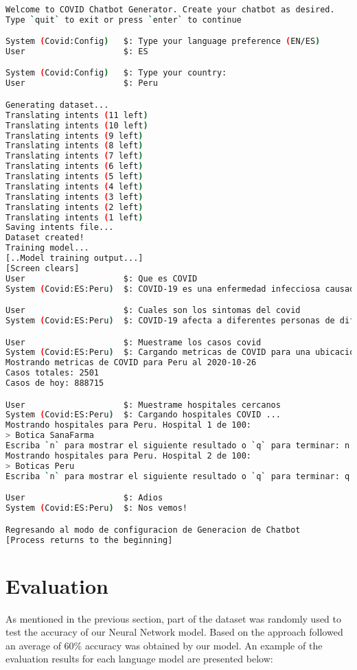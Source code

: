 \documentclass[]{article}
\begin{document}
\begin{lstlisting}[language=bash, caption=Spanish Chatbot Test Case, style=mybashcode]

Welcome to COVID Chatbot Generator. Create your chatbot as desired.
Type `quit` to exit or press `enter` to continue

System (Covid:Config)   $: Type your language preference (EN/ES)
User                    $: ES

System (Covid:Config)   $: Type your country:
User                    $: Peru

Generating dataset...
Translating intents (11 left)
Translating intents (10 left)
Translating intents (9 left)
Translating intents (8 left)
Translating intents (7 left)
Translating intents (6 left)
Translating intents (5 left)
Translating intents (4 left)
Translating intents (3 left)
Translating intents (2 left)
Translating intents (1 left)
Saving intents file...
Dataset created!
Training model...
[..Model training output...]
[Screen clears]
User                    $: Que es COVID
System (Covid:ES:Peru)  $: COVID-19 es una enfermedad infecciosa causada por el coronavirus 2 sindrome respiratorio agudo severo

User                    $: Cuales son los sintomas del covid
System (Covid:ES:Peru)  $: COVID-19 afecta a diferentes personas de diferentes maneras. Se ha informado de una amplia gama de sintomas de personas infectadas, desde sintomas leves hasta enfermedades graves.

User                    $: Muestrame los casos covid
System (Covid:ES:Peru)  $: Cargando metricas de COVID para una ubicacion especifica ...
Mostrando metricas de COVID para Peru al 2020-10-26
Casos totales: 2501
Casos de hoy: 888715

User                    $: Muestrame hospitales cercanos
System (Covid:ES:Peru)  $: Cargando hospitales COVID ...
Mostrando hospitales para Peru. Hospital 1 de 100:
> Botica SanaFarma
Escriba `n` para mostrar el siguiente resultado o `q` para terminar: n
Mostrando hospitales para Peru. Hospital 2 de 100:
> Boticas Peru
Escriba `n` para mostrar el siguiente resultado o `q` para terminar: q

User                    $: Adios
System (Covid:ES:Peru)  $: Nos vemos!

Regresando al modo de configuracion de Generacion de Chatbot
[Process returns to the beginning]
\end{lstlisting}

\section*{Evaluation}
As mentioned in the previous section, part of the dataset was randomly used to test the accuracy of our Neural Network model. Based on the approach followed an average of 60\% accuracy was obtained by our model. An example of the evaluation results for each language model are presented below:
\end{document}
